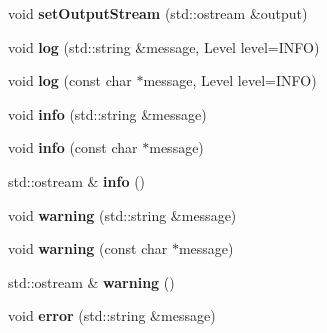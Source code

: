 \begin{DoxyCompactItemize}
\item 
\hypertarget{classtools_1_1Logger_a636053141af12bcbfb816113081c62bc}{void {\bfseries set\-Output\-Stream} (std\-::ostream \&output)}\label{classtools_1_1Logger_a636053141af12bcbfb816113081c62bc}

\item 
\hypertarget{classtools_1_1Logger_a03851adbc4399c2c0c0e0f85fc6a6ef0}{void {\bfseries log} (std\-::string \&message, Level level=I\-N\-F\-O)}\label{classtools_1_1Logger_a03851adbc4399c2c0c0e0f85fc6a6ef0}

\item 
\hypertarget{classtools_1_1Logger_a3fdf70d6ab949dd8483ed5bcd49ce420}{void {\bfseries log} (const char $\ast$message, Level level=I\-N\-F\-O)}\label{classtools_1_1Logger_a3fdf70d6ab949dd8483ed5bcd49ce420}

\item 
\hypertarget{classtools_1_1Logger_ac389acff12d26dbd3fc625c547ac04c7}{void {\bfseries info} (std\-::string \&message)}\label{classtools_1_1Logger_ac389acff12d26dbd3fc625c547ac04c7}

\item 
\hypertarget{classtools_1_1Logger_a24a476db1d106f5d4b13a9fa39d1b0dc}{void {\bfseries info} (const char $\ast$message)}\label{classtools_1_1Logger_a24a476db1d106f5d4b13a9fa39d1b0dc}

\item 
\hypertarget{classtools_1_1Logger_a91efb6571b01077f2dfb55c47aaf253e}{std\-::ostream \& {\bfseries info} ()}\label{classtools_1_1Logger_a91efb6571b01077f2dfb55c47aaf253e}

\item 
\hypertarget{classtools_1_1Logger_a5d3ae06c39df8abc23c2d81de79c882f}{void {\bfseries warning} (std\-::string \&message)}\label{classtools_1_1Logger_a5d3ae06c39df8abc23c2d81de79c882f}

\item 
\hypertarget{classtools_1_1Logger_abc773c41c59d9afbb620476341f95718}{void {\bfseries warning} (const char $\ast$message)}\label{classtools_1_1Logger_abc773c41c59d9afbb620476341f95718}

\item 
\hypertarget{classtools_1_1Logger_a8aafc0559791caa80a1f655d4da3e411}{std\-::ostream \& {\bfseries warning} ()}\label{classtools_1_1Logger_a8aafc0559791caa80a1f655d4da3e411}

\item 
\hypertarget{classtools_1_1Logger_ae7a4f4f4ad7ebf58e89e46f59c124dac}{void {\bfseries error} (std\-::string \&message)}\label{classtools_1_1Logger_ae7a4f4f4ad7ebf58e89e46f59c124dac}


\end{DoxyCompactItemize}
